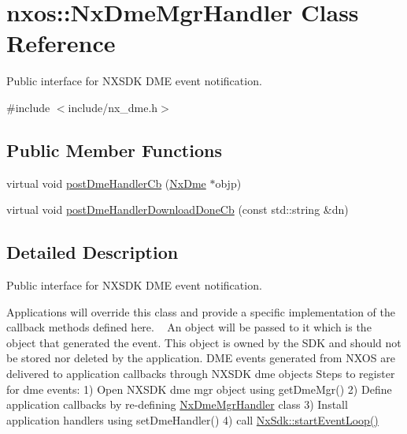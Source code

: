 \hypertarget{classnxos_1_1_nx_dme_mgr_handler}{}\section{nxos\+:\+:Nx\+Dme\+Mgr\+Handler Class Reference}
\label{classnxos_1_1_nx_dme_mgr_handler}


Public interface for N\+X\+S\+DK D\+ME event notification.  




{\ttfamily \#include $<$include/nx\+\_\+dme.\+h$>$}

\subsection*{Public Member Functions}
\begin{DoxyCompactItemize}
\item 
virtual void \mbox{\hyperlink{classnxos_1_1_nx_dme_mgr_handler_a26838519d4f1d17c2036feb036a0e892}{post\+Dme\+Handler\+Cb}} (\mbox{\hyperlink{classnxos_1_1_nx_dme}{Nx\+Dme}} $\ast$objp)
\item 
virtual void \mbox{\hyperlink{classnxos_1_1_nx_dme_mgr_handler_a785b584b966bb8212c22e506ff568236}{post\+Dme\+Handler\+Download\+Done\+Cb}} (const std\+::string \&dn)
\end{DoxyCompactItemize}


\subsection{Detailed Description}
Public interface for N\+X\+S\+DK D\+ME event notification. 

Applications will override this class and provide a specific implementation of the callback methods defined here. ~\newline
 An object will be passed to it which is the object that generated the event. This object is owned by the S\+DK and should not be stored nor deleted by the application. D\+ME events generated from N\+X\+OS are delivered to application callbacks through N\+X\+S\+DK dme objects Steps to register for dme events\+: 1) Open N\+X\+S\+DK dme mgr object using get\+Dme\+Mgr() 2) Define application callbacks by re-\/defining \mbox{\hyperlink{classnxos_1_1_nx_dme_mgr_handler}{Nx\+Dme\+Mgr\+Handler}} class 3) Install application handlers using set\+Dme\+Handler() 4) call \mbox{\hyperlink{classnxos_1_1_nx_sdk_a75ca70643fe325ddf0eea62c1f8c4cc8}{Nx\+Sdk\+::start\+Event\+Loop()}} 

